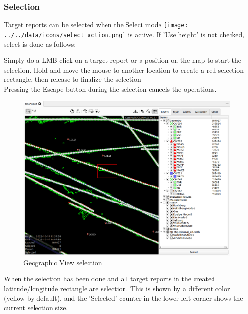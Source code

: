 \subsubsection{Selection}
\label{sec:geoview_selection}

Target reports can be selected when the Select mode \texttt{[image: ../../data/icons/select\_action.png]} is active. If 'Use height' is not checked, select is done as follows:

Simply do a LMB click on a target report or a position on the map to start the selection. Hold and move the mouse to another location to create a red selection rectangle, then release to finalize the selection. \\

Pressing the Escape button during the selection cancels the operations.

\begin{figure}[H]
    \hspace*{-2.5cm}
    \includegraphics[width=19cm,frame]{figures/geoview_select1.png}
  \caption{Geographic View selection}
\end{figure}

When the selection has been done and all target reports in the created latitude/longitude rectangle are selection. This is shown by a different color (yellow by default), and the 'Selected' counter in the lower-left corner shows the current selection size.


